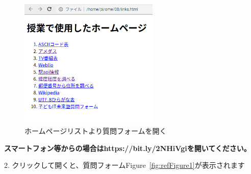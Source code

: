 








\begin{figure}[H]
  
    \begin{center}
      
      \includegraphics[width=6.638cm,height=6.204cm]{./text08-img/textbook-img017.png}
      \caption{\label{fig:refFigure0}ホームページリストより質問フォームを開く}
    \end{center}
    
\end{figure}

{\bfseries
スマートフォン等からの場合はhttps://bit.ly/2NHiVgiを開いてください。}


\bigskip

\clearpage

2.
クリックして開くと、質問フォームFigure~\ref{fig:refFigure1}が表示されます





